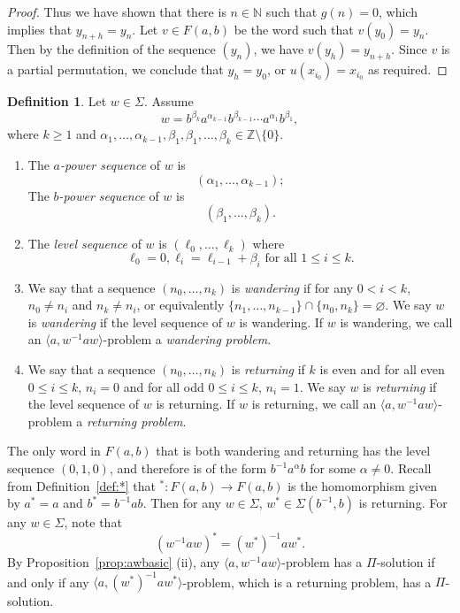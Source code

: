 \documentclass[11pt]{amsart}
\theoremstyle{definition}
\newtheorem{definition}[theorem]{Definition}
\theoremstyle{definition}
\numberwithin{equation}{section}
\begin{document}
\begin{proof}
Thus we have shown that there is $n\in\mathbb{N}$ such that $g(n)=0$, which implies that $y_{n+h}=y_n$. Let $v\in F(a, b)$ be the word such that $v(y_0)=y_n$. Then by the definition of the sequence $(y_n)$, we have $v(y_h)=y_{n+h}$. Since $v$ is a partial permutation, we conclude that $y_h=y_0$, or $u(x_{i_0})=x_{i_0}$ as required.
\end{proof}



\begin{definition} Let $w\in \Sigma$. Assume
$$ w=b^{\beta_k}a^{\alpha_{k-1}}b^{\beta_{k-1}}\cdots a^{\alpha_1}b^{\beta_1}, $$
where $k\geq 1$ and $\alpha_1,\dots, \alpha_{k-1}, \beta_1,\beta_1, \dots, \beta_k\in \mathbb{Z}\setminus\{0\}$. 
\begin{enumerate}
\item[(1)] The {\em $a$-power sequence} of $w$ is 
$$ (\alpha_1, \dots, \alpha_{k-1}); $$
The {\em $b$-power sequence} of $w$ is 
$$ (\beta_1, \dots, \beta_k). $$
\item[(2)] The {\em level sequence} of $w$ is $(\ell_0,\dots, \ell_k)$ where
$$ \ell_0=0, \ell_{i}=\ell_{i-1}+\beta_i \mbox{ for all $1\leq i\leq k$.} $$
\item[(3)] We say that a sequence $(n_0, \dots, n_k)$ is {\em wandering} if for any $0<i<k$, $n_0\neq n_i$ and $n_k\neq n_i$, or equivalently $\{n_1, \dots, n_{k-1}\}\cap \{n_0, n_k\}=\varnothing$. We say $w$ is {\em wandering} if the level sequence of $w$ is wandering. If $w$ is wandering, we call an $\langle a, w^{-1}aw\rangle$-problem a {\em wandering problem}.
\item[(4)] We say that a sequence $(n_0, \dots, n_k)$ is {\em returning} if $k$ is even and for all even $0\leq i\leq k$, $n_i=0$ and for all odd $0\leq i\leq k$, $n_i=1$. We say $w$ is {\em returning} if the level sequence of $w$ is returning. If $w$ is returning, we call an $\langle a,w^{-1}aw\rangle$-problem a {\em returning problem}.
\end{enumerate}
\end{definition}

The only word in $F(a, b)$ that is both wandering and returning has the level sequence $(0,1,0)$, and therefore is of the form $b^{-1}a^\alpha b$ for some $\alpha\neq 0$. Recall from Definition~\ref{def:*} that ${}^*\colon F(a, b)\to F(a, b)$ is the homomorphism given by $a^*=a$ and $b^*=b^{-1}ab$. Then for any $w\in \Sigma$, $w^*\in \Sigma(b^{-1}, b)$ is returning. For any $w\in \Sigma$, note that 
$$ (w^{-1}aw)^*=(w^*)^{-1}aw^*. $$
By Proposition~\ref{prop:awbasic} (ii), any $\langle a, w^{-1}aw\rangle$-problem has a $\Pi$-solution if and only if any $\langle a, (w^*)^{-1}aw^*\rangle$-problem, which is a returning problem, has a $\Pi$-solution. 
\end{document}
